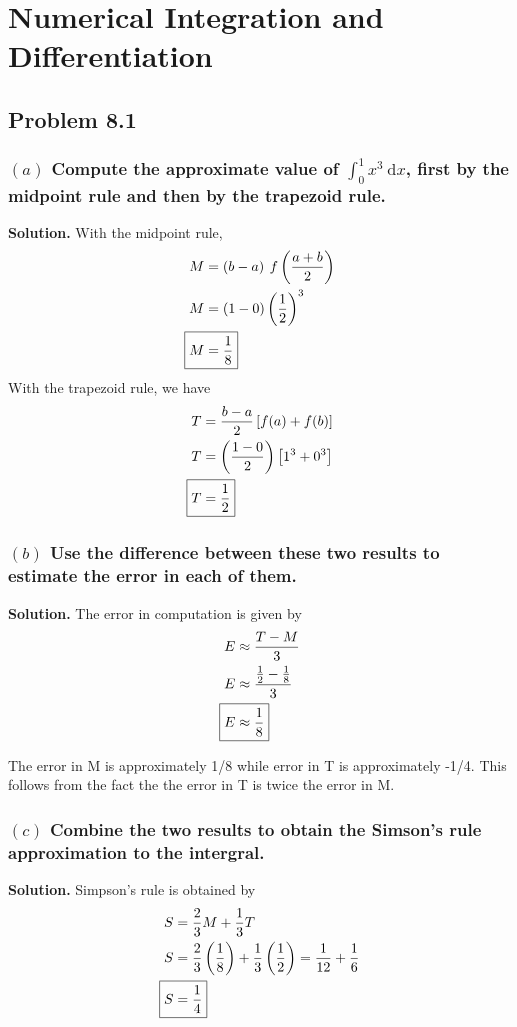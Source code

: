 \section{Numerical Integration and Differentiation}
\subsection{Problem 8.1}
\subsubsection*{$(a)$ Compute the approximate value of $\int_{0}^{1} x^3\:\mathrm{d}x$, first by the midpoint rule and then by the trapezoid rule.}

\textbf{Solution.} With the midpoint rule,
\begin{align*}
M &= \left(b-a\right)\:f\left(\frac{a+b}{2}\right)\\
M &= \left(1-0\right)\left(\frac{1}{2}\right)^3\\
\Aboxed{M &= \frac{1}{8}}
\end{align*}
With the trapezoid rule, we have
\begin{align*}
T &= \frac{b-a}{2}\left[f(a)+f(b)\right]\\
T &= \left(\frac{1-0}{2}\right)\left[1^3+0^3\right]\\
\Aboxed{T &= \frac{1}{2}}
\end{align*}

\subsubsection*{$(b)$ Use the difference between these two results to estimate the error in each of them.}

\textbf{Solution.} The error in computation is given by
\begin{align*}
E &\approx \frac{T-M}{3}\\
E &\approx \frac{\frac{1}{2}-\frac{1}{8}}{3}\\
\Aboxed{E &\approx \frac{1}{8}}
\end{align*}

The error in M is approximately 1/8 while error in T is approximately -1/4. This follows from the fact the the error in T is twice the error in M.

\subsubsection*{$(c)$ Combine the two results to obtain the Simson's rule approximation to the intergral.}
\textbf{Solution.} Simpson's rule is obtained by
\begin{align*}
S &= \frac{2}{3}M + \frac{1}{3}T\\
S &= \frac{2}{3}\left(\frac{1}{8}\right) + \frac{1}{3}\left(\frac{1}{2}\right) = \frac{1}{12} + \frac{1}{6}\\
\Aboxed{S &= \frac{1}{4}}
\end{align*}

